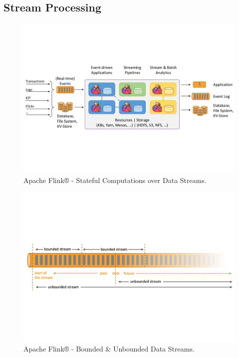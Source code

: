 \subsection{Stream Processing}\label{sec:stream_processing}
\begin{figure}[t]
	\vspace{-1.5cm}
	\centering
	\includegraphics[width=\columnwidth]{Images/apache_flink.pdf}
	\vspace{-2.5cm}
	\caption[Apache Flink® - Stateful Computations over Data Streams.]{Apache Flink® - Stateful Computations over Data Streams.}
	\vspace{1.5cm}
	\label{fig:apache_flink}
\end{figure}
\begin{figure}
	\vspace{-2.5cm}
	\centering
	\includegraphics[width=\columnwidth]{Images/apache_flink_data_streams.pdf}
	\vspace{-3cm}
	\caption[Apache Flink® - Bounded \& Unbounded Data Streams.]{Apache Flink® - Bounded \& Unbounded Data Streams.}
	\label{fig:apache_flink_data_streams}
\end{figure}

